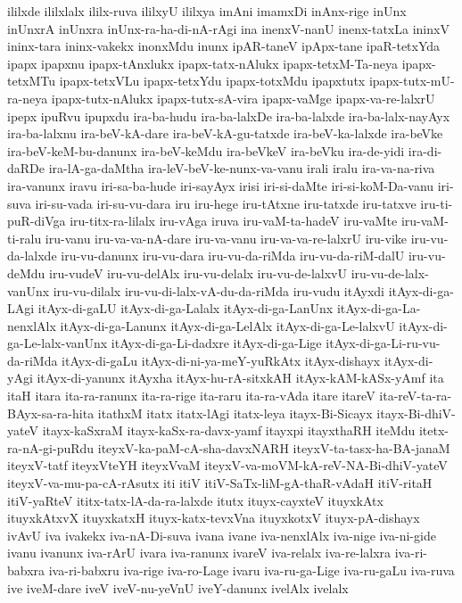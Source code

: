 {ililxde
ililxlalx
ililx-ruva
ililxyU
ililxya
imAni
imamxDi
inAnx-rige
inUnx
inUnxrA
inUnxra
inUnx-ra-ha-di-nA-rAgi
ina
inenxV-nanU
inenx-tatxLa
ininxV
ininx-tara
ininx-vakekx
inonxMdu
inunx
ipAR-taneV
ipApx-tane
ipaR-tetxYda
ipapx
ipapxnu
ipapx-tAnxlukx
ipapx-tatx-nAlukx
ipapx-tetxM-Ta-neya
ipapx-tetxMTu
ipapx-tetxVLu
ipapx-tetxYdu
ipapx-totxMdu
ipapxtutx
ipapx-tutx-mU-ra-neya
ipapx-tutx-nAlukx
ipapx-tutx-sA-vira
ipapx-vaMge
ipapx-va-re-lalxrU
ipepx
ipuRvu
ipupxdu
ira-ba-hudu
ira-ba-lalxDe
ira-ba-lalxde
ira-ba-lalx-nayAyx
ira-ba-lalxnu
ira-beV-kA-dare
ira-beV-kA-gu-tatxde
ira-beV-ka-lalxde
ira-beVke
ira-beV-keM-bu-danunx
ira-beV-keMdu
ira-beVkeV
ira-beVku
ira-de-yidi
ira-di-daRDe
ira-lA-ga-daMtha
ira-leV-beV-ke-nunx-va-vanu
irali
iralu
ira-va-na-riva
ira-vanunx
iravu
iri-sa-ba-hude
iri-sayAyx
irisi
iri-si-daMte
iri-si-koM-Da-vanu
iri-suva
iri-su-vada
iri-su-vu-dara
iru
iru-hege
iru-tAtxne
iru-tatxde
iru-tatxve
iru-ti-puR-diVga
iru-titx-ra-lilalx
iru-vAga
iruva
iru-vaM-ta-hadeV
iru-vaMte
iru-vaM-ti-ralu
iru-vanu
iru-va-va-nA-dare
iru-va-vanu
iru-va-va-re-lalxrU
iru-vike
iru-vu-da-lalxde
iru-vu-danunx
iru-vu-dara
iru-vu-da-riMda
iru-vu-da-riM-dalU
iru-vu-deMdu
iru-vudeV
iru-vu-delAlx
iru-vu-delalx
iru-vu-de-lalxvU
iru-vu-de-lalx-vanUnx
iru-vu-dilalx
iru-vu-di-lalx-vA-du-da-riMda
iru-vudu
itAyxdi
itAyx-di-ga-LAgi
itAyx-di-gaLU
itAyx-di-ga-Lalalx
itAyx-di-ga-LanUnx
itAyx-di-ga-La-nenxlAlx
itAyx-di-ga-Lanunx
itAyx-di-ga-LelAlx
itAyx-di-ga-Le-lalxvU
itAyx-di-ga-Le-lalx-vanUnx
itAyx-di-ga-Li-dadxre
itAyx-di-ga-Lige
itAyx-di-ga-Li-ru-vu-da-riMda
itAyx-di-gaLu
itAyx-di-ni-ya-meY-yuRkAtx
itAyx-dishayx
itAyx-di-yAgi
itAyx-di-yanunx
itAyxha
itAyx-hu-rA-sitxkAH
itAyx-kAM-kASx-yAmf
ita
itaH
itara
ita-ra-ranunx
ita-ra-rige
ita-raru
ita-ra-vAda
itare
itareV
ita-reV-ta-ra-BAyx-sa-ra-hita
itathxM
itatx
itatx-lAgi
itatx-leya
itayx-Bi-Sicayx
itayx-Bi-dhiV-yateV
itayx-kaSxraM
itayx-kaSx-ra-davx-yamf
itayxpi
itayxthaRH
iteMdu
itetx-ra-nA-gi-puRdu
iteyxV-ka-paM-cA-sha-davxNARH
iteyxV-ta-tasx-ha-BA-janaM
iteyxV-tatf
iteyxVteYH
iteyxVvaM
iteyxV-va-moVM-kA-reV-NA-Bi-dhiV-yateV
iteyxV-va-mu-pa-cA-rAsutx
iti
itiV
itiV-SaTx-liM-gA-thaR-vAdaH
itiV-ritaH
itiV-yaRteV
ititx-tatx-lA-da-ra-lalxde
itutx
ituyx-cayxteV
ituyxkAtx
ituyxkAtxvX
ituyxkatxH
ituyx-katx-tevxVna
ituyxkotxV
ituyx-pA-dishayx
ivAvU
iva
ivakekx
iva-nA-Di-suva
ivana
ivane
iva-nenxlAlx
iva-nige
iva-ni-gide
ivanu
ivanunx
iva-rArU
ivara
iva-ranunx
ivareV
iva-relalx
iva-re-lalxra
iva-ri-babxra
iva-ri-babxru
iva-rige
iva-ro-Lage
ivaru
iva-ru-ga-Lige
iva-ru-gaLu
iva-ruva
ive
iveM-dare
iveV
iveV-nu-yeVnU
iveY-danunx
ivelAlx
ivelalx
}
